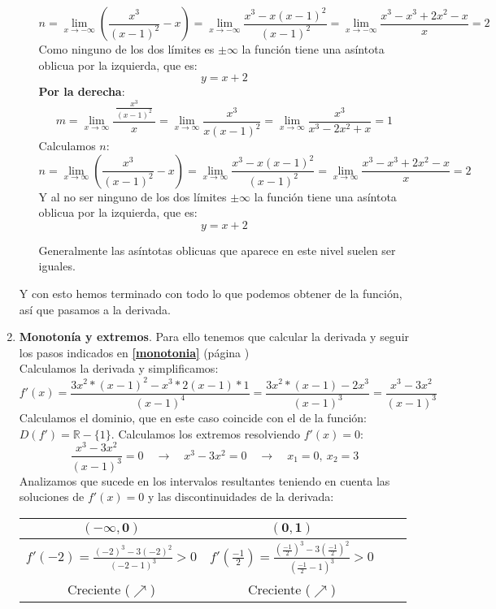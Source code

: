 \documentclass[a4paper,11pt,answers]{exam}
\newcommand\ddfrac[2]{\frac{\displaystyle #1}{\displaystyle #2}}
\begin{document}
\begin{solution}
\begin{enumerate}
\begin{itemize}
	\[n = \lim_{x \to -\infty} \left(\frac{x^3}{(x-1)^2} - x\right) =
	\lim_{x \to -\infty}\frac{x^3 - x(x-1)^2}{(x-1)^2} =
	\lim_{x \to -\infty} \frac{x^3 -x^3 + 2x^2- x}{x} = 2\]
	Como ninguno de los dos límites es $\pm\infty$ la función tiene una asíntota oblicua por la izquierda, que es:
	\[y = x + 2\]
	\textbf{Por la derecha}:
	\[m = \lim_{x \to \infty} \ddfrac{\ \frac{x^3}{(x -1)^2}\ }{x} =
	\lim_{x \to \infty} \frac{x^3}{x(x-1)^2} = 
	\lim_{x \to \infty} \frac{x^3}{x^3 - 2x^2 + x} = 1\]
	Calculamos $n$:
	\[n = \lim_{x \to \infty} \left(\frac{x^3}{(x-1)^2} - x\right) =
	\lim_{x \to \infty}\frac{x^3 - x(x-1)^2}{(x-1)^2} =
	\lim_{x \to \infty} \frac{x^3 -x^3 + 2x^2- x}{x} = 2\]
	Y  al no ser ninguno de los dos límites $\pm\infty$ la función tiene una asíntota oblicua por la izquierda, que es:
	\[y = x + 2\]
	
	Generalmente las asíntotas oblicuas que aparece en este nivel suelen ser iguales.
	\end{itemize}
	
	Y con esto hemos terminado con todo lo que podemos obtener de la función, así que pasamos a la derivada.
	\item \textbf{Monotonía y extremos}. Para ello tenemos que calcular la derivada y seguir los pasos indicados en \textbf{\ref{monotonia}} (página \pageref{monotonia})\\
	Calculamos la derivada y simplificamos:
	\[f'(x) = \frac{3x^2 *(x-1)^2 - x^3*2(x-1)*1}{(x-1)^4} =
	\frac{3x^2 *(x-1) - 2x^3}{(x-1)^3} = \frac{x^3 - 3x^2}{(x-1)^3}\]
	Calculamos el dominio, que en este caso coincide con el de la función: $D(f') = \mathbb{R} - \{1\}$.
	Calculamos los extremos resolviendo $f'(x) = 0$:
	\[\frac{x^3 - 3x^2}{(x-1)^3} = 0\quad\to\quad x^3 - 3x^2 = 0\quad\to\quad
	x_1 = 0,\ x_ 2=3\]
	Analizamos que sucede en los intervalos resultantes teniendo en cuenta las soluciones de $f'(x) = 0$ y las discontinuidades de la derivada:\\
	\begin{center}
	\begin{tabular}{|Sc|Sc|}
	\hline
	$\boldsymbol{(-\infty, 0)}$&$\boldsymbol{(0,1)}$\\
	\hline
	$f'(-2) = \frac{(-2)^3 - 3(-2)^2}{(-2-1)^3} >0$&
	$f'\left(\frac{-1}{2}\right) = \ddfrac{\left(\frac{-1}{2}\right)^3 - 3\left(\frac{-1}{2}\right)^2}{\left(\frac{-1}{2}-1\right)^3} > 0$\\
	\hline
	Creciente ($\nearrow$)&Creciente ($\nearrow$)\\
	\hline
	\end{tabular}
	

\end{center}
\end{enumerate}
\end{solution}
\end{document}
